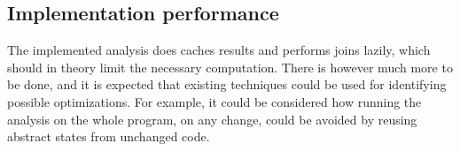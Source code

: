 \subsection{Implementation performance}
The implemented analysis does caches results and performs joins lazily, which should in theory limit the necessary computation. There is however much more to be done, and it is expected that existing techniques could be used for identifying possible optimizations. For example, it could be considered how running the analysis on the whole program, on any change, could be avoided by reusing abstract states from unchanged code. 

